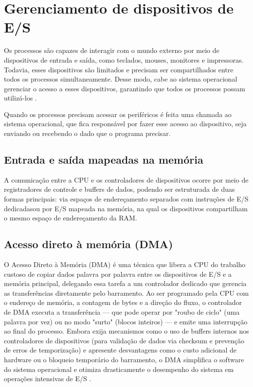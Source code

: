 \documentclass[
	12pt,				%
	oneside,
	a4paper,			%
	english,			%
	french,				%
	spanish,			%
	brazil,				%
	]{abntex2}
\begin{document}
\section{Gerenciamento de dispositivos de E/S}

Os processos são capazes de interagir com o mundo externo por meio de dispositivos de entrada e saída, como teclados, mouses, monitores e impressoras. Todavia, esses dispositivos são limitados e precisam ser compartilhados entre todos os processos simultaneamente. Desse modo, cabe ao sistema operacional gerenciar o acesso a esses dispositivos, garantindo que todos os processos possam utilizá-los \cite{tanenbaum2016sistemas}.

Quando os processos precisam acessar os periféricos é feita uma chamada ao sistema operacional, que fica responsável por fazer esse acesso ao dispositivo, seja enviando ou recebendo o dado que o programa precisar.

\subsection{Entrada e saída mapeadas na memória}

A comunicação entre a CPU e os controladores de dispositivos ocorre por meio de registradores de controle e buffers de dados, podendo ser estruturada de duas formas principais: via espaços de endereçamento separados com instruções de E/S dedicadasou por E/S mapeada na memória, na qual os dispositivos compartilham o mesmo espaço de endereçamento da RAM. \cite{tanenbaum2016sistemas}

\subsection{Acesso direto à memória (DMA)}

O Acesso Direto à Memória (DMA) é uma técnica que libera a CPU do trabalho custoso de copiar dados palavra por palavra entre os dispositivos de E/S e a memória principal, delegando essa tarefa a um controlador dedicado que gerencia as transferências diretamente pelo barramento. Ao ser programado pela CPU com o endereço de memória, a contagem de bytes e a direção do fluxo, o controlador de DMA executa a transferência — que pode operar por "roubo de ciclo" (uma palavra por vez) ou no modo "surto" (blocos inteiros) — e emite uma interrupção ao final do processo. Embora exija mecanismos como o uso de buffers internos nos controladores de dispositivos (para validação de dados via checksum e prevenção de erros de temporização) e apresente desvantagens como o custo adicional de hardware ou o bloqueio temporário do barramento, o DMA simplifica o software do sistema operacional e otimiza drasticamente o desempenho do sistema em operações intensivas de E/S \cite{tanenbaum2016sistemas}.
\end{document}
